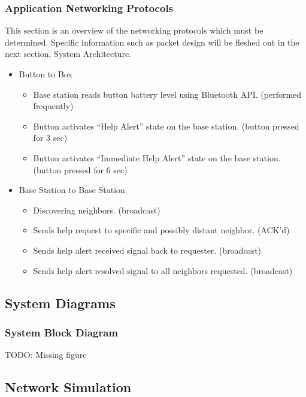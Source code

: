 \documentclass[journal,compsoc]{IEEEtran}
\begin{document}
\subsubsection{Application Networking Protocols}

This section is an overview of the networking protocols which must be determined.  Specific information such as packet design will be fleshed out in the next section, System Architecture.

\begin{itemize}
  \item Button to Box
    \begin{itemize}
      \item Base station reads button battery level using Bluetooth API. (performed frequently)
      \item Button activates “Help Alert” state on the base station. (button pressed for 3 sec)
      \item Button activates “Immediate Help Alert” state on the base station. (button pressed for 6 sec)
    \end{itemize}
  \item Base Station to Base Station
    \begin{itemize}
      \item Discovering neighbors. (broadcast)
      \item Sends help request to specific and possibly distant neighbor. (ACK’d)
      \item Sends help alert received signal back to requester. (broadcast)
      \item Sends help alert resolved signal to all neighbors requested. (broadcast)
    \end{itemize}
\end{itemize}

\subsection{System Diagrams}

\subsubsection{System Block Diagram}

TODO: Missing figure

\subsection{Network Simulation}
\end{document}
